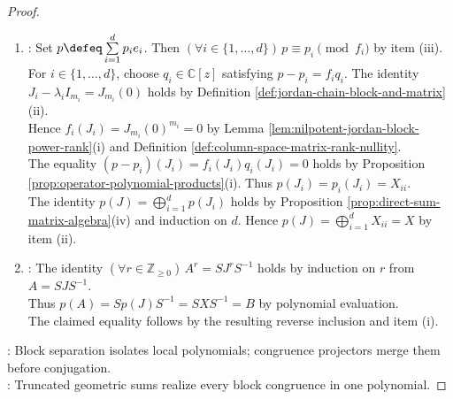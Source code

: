 \begin{theorem}
\begin{proof}
\begin{enumerate}[label=(\roman*)]
For $i\in\{1,\ldots,d\}$, set $f_i(z)\defeq(z-\lambda_i)^{m_i}$ and $F_i(z)\defeq\prod\limits_{j\neq i}f_j(z)$, where an empty product equals $1$.\\
Set $c_i\defeq F_i(\lambda_i)=\prod\limits_{j\neq i}(\lambda_i-\lambda_j)^{m_j}\neq0$ and $u_i(z)\defeq c_i^{-1}F_i(z)-1$.\\
The divisibility $z-\lambda_i\mid u_i(z)$ holds by $u_i(\lambda_i)=0$ and expansion in powers of $z-\lambda_i$. Set $e_i(z)\defeq c_i^{-1}F_i(z)\sum\limits_{r=0}^{m_i-1}(-u_i(z))^r$.\\
The identity $e_i=1-(-u_i)^{m_i}$ holds by $c_i^{-1}F_i=1+u_i$ and the finite geometric-sum identity. Hence $e_i\equiv1\pmod{f_i}$ by $z-\lambda_i\mid u_i$.\\
The relation $(\forall k\in\{1,\ldots,d\}\setminus\{i\})\,e_i\equiv0\pmod{f_k}$ holds by $f_k\mid F_i$.
\item {}: Set $p\defeq\sum\limits_{i=1}^{d}p_ie_i$. Then $(\forall i\in\{1,\ldots,d\})\,p\equiv p_i\pmod{f_i}$ by item (iii).\\
For $i\in\{1,\ldots,d\}$, choose $q_i\in\mathbb{C}[z]$ satisfying $p-p_i=f_iq_i$. The identity $J_i-\lambda_iI_{m_i}=J_{m_i}(0)$ holds by Definition \ref{def:jordan-chain-block-and-matrix}(ii).\\
Hence $f_i(J_i)=J_{m_i}(0)^{m_i}=0$ by Lemma \ref{lem:nilpotent-jordan-block-power-rank}(i) and Definition \ref{def:column-space-matrix-rank-nullity}.\\
The equality $(p-p_i)(J_i)=f_i(J_i)q_i(J_i)=0$ holds by Proposition \ref{prop:operator-polynomial-products}(i). Thus $p(J_i)=p_i(J_i)=X_{ii}$.\\
The identity $p(J)=\bigoplus\limits_{i=1}^{d}p(J_i)$ holds by Proposition \ref{prop:direct-sum-matrix-algebra}(iv) and induction on $d$. Hence $p(J)=\bigoplus\limits_{i=1}^{d}X_{ii}=X$ by item (ii).
\item {}: The identity $(\forall r\in\mathbb{Z}_{\geq0})\,A^r=SJ^rS^{-1}$ holds by induction on $r$ from $A=SJS^{-1}$.\\
Thus $p(A)=Sp(J)S^{-1}=SXS^{-1}=B$ by polynomial evaluation.\\
The claimed equality follows by the resulting reverse inclusion and item (i).
\end{enumerate}
: Block separation isolates local polynomials; congruence projectors merge them before conjugation.\\
: Truncated geometric sums realize every block congruence in one polynomial.
\end{proof}
\end{theorem}

